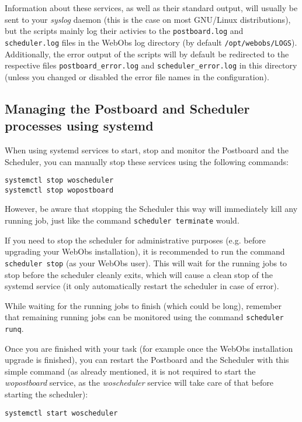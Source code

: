 Information about these services, as well as their standard output, will
usually be sent to your \textit{syslog} daemon (this is the case on most
GNU/Linux distributions), but the scripts mainly log their activies to the
\texttt{postboard.log} and \texttt{scheduler.log} files in the WebObs log
directory (by default \texttt{/opt/webobs/LOGS}). Additionally, the error
output of the scripts will by default be redirected to the respective files
\texttt{postboard\_error.log} and \texttt{scheduler\_error.log} in this
directory (unless you changed or disabled the error file names in the
configuration).

\subsection*{Managing the Postboard and Scheduler processes using systemd}

When using systemd services to start, stop and monitor the Postboard and the
Scheduler, you can manually stop these services using the following commands:
\begin{lstlisting}[style=console]
systemctl stop woscheduler
systemctl stop wopostboard
\end{lstlisting}
However, be aware that stopping the Scheduler this way will immediately kill
any running job, just like the command \texttt{scheduler terminate} would.

If you need to stop the scheduler for administrative purposes (e.g. before
upgrading your WebObs installation), it is recommended to run the command
\texttt{scheduler stop} (as your WebObs user). This will wait for the running
jobs to stop before the scheduler cleanly exits, which will cause a clean stop
of the systemd service (it only automatically restart the scheduler in case of
error).

While waiting for the running jobs to finish (which could be long), remember
that remaining running jobs can be monitored using the command
\texttt{scheduler runq}.

Once you are finished with your task (for example once the WebObs installation
upgrade is finished), you can restart the Postboard and the Scheduler with this
simple command (as already mentioned, it is not required to start the
\textit{wopostboard} service, as the \textit{woscheduler} service will take
care of that before starting the scheduler):
\begin{lstlisting}[style=console]
systemctl start woscheduler
\end{lstlisting}



